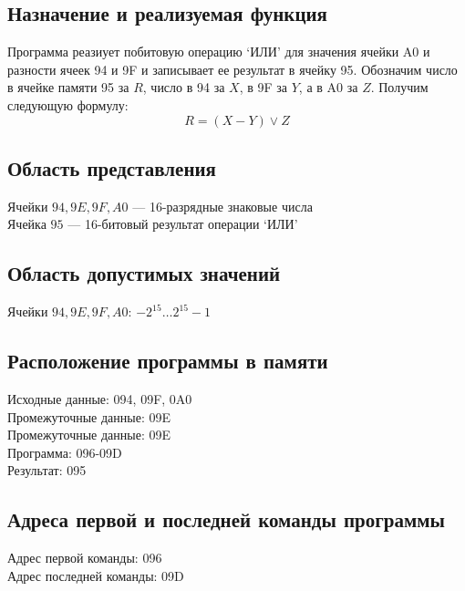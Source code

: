 \subsection{Назначение и реализуемая функция}
Программа реазиует побитовую операцию `ИЛИ' для значения ячейки A0 и разности ячеек 94 и 9F и записывает ее результат в ячейку 95. Обозначим число в ячейке памяти 95 за $R$, число в 94 за $X$, в 9F за $Y$, а в A0 за $Z$. Получим следующую формулу:
$$R=(X-Y) \vee Z$$

\subsection{Область представления}
\noindent Ячейки $94, 9E, 9F, A0$ --- 16-разрядные знаковые числа\\
Ячейка $95$ --- 16-битовый результат операции `ИЛИ'

\subsection{Область допустимых значений}
\noindent Ячейки $94, 9E, 9F, A0$: $-2^{15}\ldots2^{15}-1$

\subsection{Расположение программы в памяти}
\noindent Исходные данные: 094, 09F, 0A0\\
\noindent Промежуточные данные: 09E\\
\noindent Промежуточные данные: 09E\\
\noindent Программа: 096-09D\\
\noindent Результат: 095

\subsection{Адреса первой и последней команды программы}
\noindent Адрес первой команды: 096\\
\noindent Адрес последней команды: 09D

